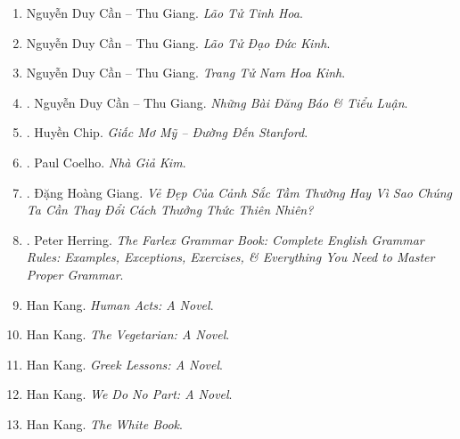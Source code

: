 \documentclass{article}
\begin{document}
\begin{enumerate}
	\item {\sc Nguyễn Duy Cần -- Thu Giang}. {\it Lão Tử Tinh Hoa}.
	
	\item {\sc Nguyễn Duy Cần -- Thu Giang}. {\it Lão Tử Đạo Đức Kinh}.
	
	\item {\sc Nguyễn Duy Cần -- Thu Giang}. {\it Trang Tử Nam Hoa Kinh}.
	
	\item \cite{Can_essay}. {\sc Nguyễn Duy Cần -- Thu Giang}. {\it Những Bài Đăng Báo \& Tiểu Luận}.\hfill{\sf[reading]}
	
	\item \cite{Chip_US_dream}. {\sc Huyền Chip}. {\it Giấc Mơ Mỹ -- Đường Đến Stanford}.\hfill{\sf[done]}
	
	\item \cite{Coelho_alchemist_VN}. {\sc Paul Coelho}. {\it Nhà Giả Kim}.\hfill{\sf[done]}
	
	\item \cite{Giang_nature}. {\sc Đặng Hoàng Giang}. {\it Vẻ Đẹp Của Cảnh Sắc Tầm Thường Hay Vì Sao Chúng Ta Cần Thay Đổi Cách Thưởng Thức Thiên Nhiên?}\hfill{\sf[done]}
	
	\item \cite{Herring2016}. {\sc Peter Herring}. {\it The Farlex Grammar Book: Complete English Grammar Rules: Examples, Exceptions, Exercises, \& Everything You Need to Master Proper Grammar}.\hfill{\sf[reading]}
	
	\item {\sc Han Kang}. {\it Human Acts: A Novel}.
	
	\item {\sc Han Kang}. {\it The Vegetarian: A Novel}.
	
	\item {\sc Han Kang}. {\it Greek Lessons: A Novel}.
	
	\item {\sc Han Kang}. {\it We Do No Part: A Novel}.
	
	\item {\sc Han Kang}. {\it The White Book}. {}
	

\end{enumerate}
\end{document}
